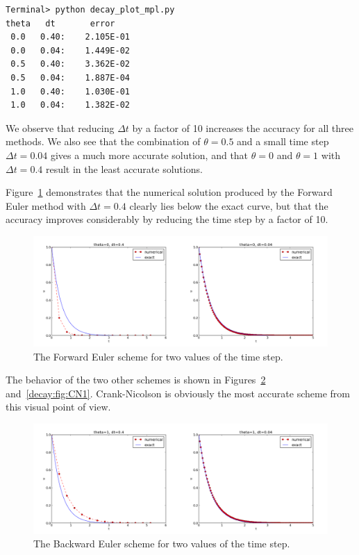 \documentclass[%
oneside,                 %
final,                   %
10pt]{article}
\begin{document}
\begin{Verbatim}[frame=lines,label=\fbox{{\tiny Terminal}},framesep=2.5mm,framerule=0.7pt,fontsize=\fontsize{9pt}{9pt}]
Terminal> python decay_plot_mpl.py
theta   dt       error
 0.0   0.40:    2.105E-01
 0.0   0.04:    1.449E-02
 0.5   0.40:    3.362E-02
 0.5   0.04:    1.887E-04
 1.0   0.40:    1.030E-01
 1.0   0.04:    1.382E-02
\end{Verbatim}
We observe that reducing $\Delta t$ by a factor of 10 increases the
accuracy for all three methods. We also see that
the combination of $\theta=0.5$ and a small time step $\Delta t =0.04$
gives a much more accurate solution, and that $\theta=0$ and $\theta=1$
with $\Delta t = 0.4$ result in the least accurate solutions.

Figure~\ref{decay:fig:FE1} demonstrates that the numerical solution
produced by the Forward Euler method with
$\Delta t=0.4$ clearly lies below the exact curve, but that the
accuracy improves considerably by reducing the time step by a factor
of 10.


\begin{figure}[!ht]  %
  \centerline{\includegraphics[width=1.1\linewidth]{fig-alg/FE1.png}}
  \caption{
  The Forward Euler scheme for two values of the time step. \label{decay:fig:FE1}
  }
\end{figure}


The behavior of the two other schemes is shown in Figures~\ref{decay:fig:BE1}
and~\ref{decay:fig:CN1}. Crank-Nicolson is obviously the most accurate
scheme from this visual point of view.


\begin{figure}[!ht]  %
  \centerline{\includegraphics[width=1.1\linewidth]{fig-alg/BE1.png}}
  \caption{
  The Backward Euler scheme for two values of the time step. \label{decay:fig:BE1}
  }
\end{figure}
\end{document}
